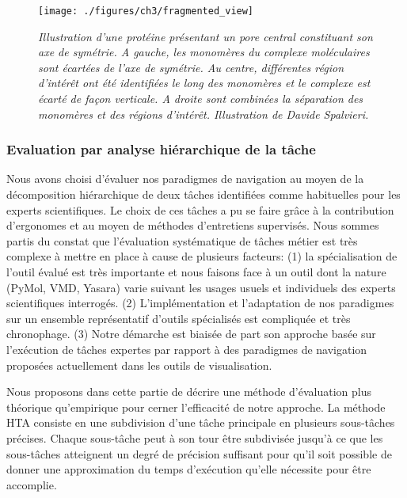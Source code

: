 \begin{figure}[h]
  \centering
  {\texttt{[image: ./figures/ch3/fragmented\_view]}}
    \caption[Illustration d'une protéine présentant un pore central constituant son axe de symétrie.]{{\it Illustration d'une protéine présentant un pore central constituant son axe de symétrie. A gauche, les monomères du complexe moléculaires sont écartées de l'axe de symétrie. Au centre, différentes région d'intérêt ont été identifiées le long des monomères et le complexe est écarté de façon verticale. A droite sont combinées la séparation des monomères et des régions d'intérêt. Illustration de Davide Spalvieri.}}
  \label{Fig:fragmented_view}
  \hspace{0.2cm}
\end{figure}


\subsubsection{Evaluation par analyse hiérarchique de la tâche} \label{hta_eval}

Nous avons choisi d'évaluer nos paradigmes de navigation au moyen de la décomposition hiérarchique de deux tâches identifiées comme habituelles pour les experts scientifiques. Le choix de ces tâches a pu se faire grâce à la contribution d'ergonomes et au moyen de méthodes d'entretiens supervisés.
Nous sommes partis du constat que l'évaluation systématique de tâches métier est très complexe à mettre en place à cause de plusieurs facteurs: (1) la spécialisation de l'outil évalué est très importante et nous faisons face à un outil dont la nature (PyMol, VMD, Yasara) varie suivant les usages usuels et individuels des experts scientifiques interrogés. (2) L'implémentation et l'adaptation de nos paradigmes sur un ensemble représentatif d'outils spécialisés est compliquée et très chronophage. (3) Notre démarche est biaisée de part son approche basée sur l'exécution de tâches expertes par rapport à des paradigmes de navigation proposées actuellement dans les outils de visualisation. %

Nous proposons dans cette partie de décrire une méthode d'évaluation plus théorique qu'empirique pour cerner l'efficacité de notre approche. La méthode HTA consiste en une subdivision d'une tâche principale en plusieurs sous-tâches précises. Chaque sous-tâche peut à son tour être subdivisée jusqu'à ce que les sous-tâches atteignent un degré de précision suffisant pour qu'il soit possible de donner une approximation du temps d'exécution qu'elle nécessite pour être accomplie.

